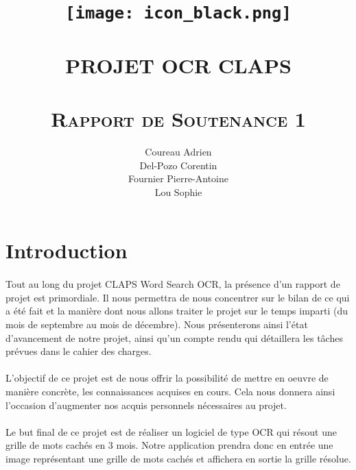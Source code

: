 \documentclass{article}
\begin{document}
\title{ \HUGE \textbf{ \texttt{[image: icon\_black.png]}}
		\\ [2.0cm]
		\Xhline{2pt} \\
        [0.5cm]
		\LARGE \uppercase{Projet OCR CLAPS}\\
        [0.5cm]
		\Xhline{2pt} \\ 
        [4cm]
		\textsc{Rapport de Soutenance 1}}
  
\author{
    Coureau Adrien\\
    Del-Pozo Corentin\\
    Fournier Pierre-Antoine\\
    Lou Sophie\\
}
\date{}
\maketitle
\newpage
\large
\pagestyle{fancy}
\cfoot{\thepage}
\tableofcontents
\pagebreak

\lhead{}

\renewcommand{\headrulewidth}{1pt}
\renewcommand{\footrulewidth}{1pt}
\section{Introduction}
\paragraph{}
Tout au long du projet CLAPS Word Search OCR, la présence d’un rapport de projet est primordiale. Il nous permettra de nous concentrer sur le bilan de ce qui a été fait et la manière dont nous allons traiter le projet sur le temps imparti (du mois de septembre au mois de décembre).
Nous présenterons ainsi l’état d’avancement de notre projet, ainsi qu’un compte rendu qui détaillera les tâches prévues dans le cahier des charges.
\paragraph{}
L’objectif de ce projet est de nous offrir la possibilité de mettre en oeuvre de manière concrète, les connaissances acquises en cours. Cela nous donnera ainsi l’occasion d’augmenter nos acquis personnels nécessaires au projet.
\paragraph{}
Le but final de ce projet est de réaliser un logiciel de type OCR qui résout une grille de mots cachés en 3 mois. Notre application prendra donc en entrée une image représentant une grille de mots cachés et affichera en sortie la grille résolue.
\end{document}
